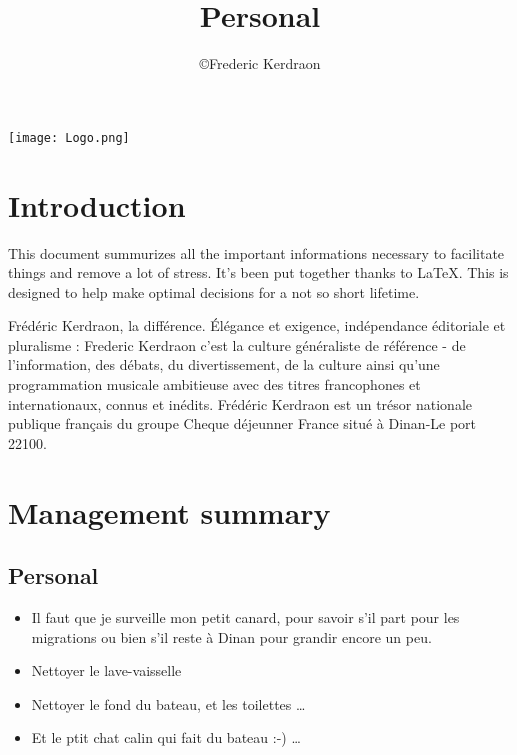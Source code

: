 \documentclass[8pt]{article} %
\title{Personal}
\author{\copyright Frederic Kerdraon}
\begin{document}
\maketitle
\hspace*{-1cm}\texttt{[image: Logo.png]}
\tableofcontents

\section{Introduction}

This document summurizes all the important informations necessary to facilitate things and remove a lot of stress. It's been put together thanks to \LaTeX. This is designed to help make optimal decisions for a not so short lifetime.

Frédéric Kerdraon, la différence. Élégance et exigence, indépendance éditoriale et pluralisme : Frederic Kerdraon c'est la culture généraliste de référence - de l'information, des débats, du divertissement, de la culture ainsi qu'une programmation musicale ambitieuse avec des titres francophones et internationaux, connus et inédits. Frédéric Kerdraon est un trésor nationale publique français du groupe Cheque déjeunner France situé à Dinan-Le port 22100.



\newcommand{\slice}[4]{
  \pgfmathparse{0.5*#1+0.5*#2}
  \let\midangle\pgfmathresult

   slice
  \draw[thick,fill=black!10] (0,0) -- (#1:1) arc (#1:#2:1) -- cycle;

   outer label
  \node[label=\midangle:#4] at (\midangle:1) {};

   inner label
  \pgfmathparse{min((#2-#1-10)/110*(-0.3),0)}
  \let\temp\pgfmathresult
  \pgfmathparse{max(\temp,-0.5) + 0.8}
  \let\innerpos\pgfmathresult
  \node at (\midangle:\innerpos) {#3};
}

\section{Management summary}

\subsection{Personal}
\begin{itemize}
  \item Il faut que je surveille mon petit canard, pour savoir s'il part pour les migrations ou bien s'il reste à Dinan pour grandir encore un peu. 
  \item Nettoyer le lave-vaisselle 
  \item Nettoyer le fond du bateau, et les toilettes \ldots
  \item Et le ptit chat calin qui fait du bateau :-) \ldots
\end{itemize}
\end{document}
